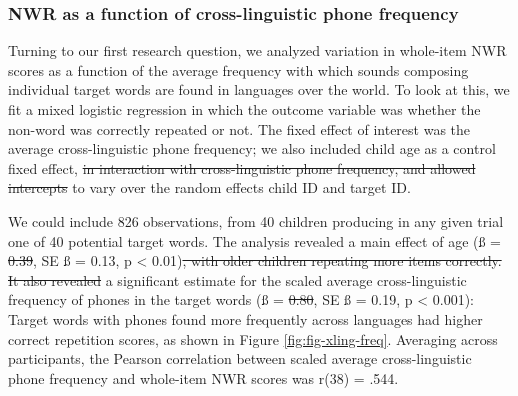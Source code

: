 \documentclass[english,,man,floatsintext]{apa6} %
\providecommand{\DIFaddtex}[1]{{\protect\color{blue}\uwave{#1}}} %
\providecommand{\DIFdeltex}[1]{{\protect\color{red}\sout{#1}}}                      %
\providecommand{\DIFaddbegin}{} %
\providecommand{\DIFaddend}{} %
\providecommand{\DIFdelbegin}{} %
\providecommand{\DIFdelend}{} %
\providecommand{\DIFadd}[1]{\texorpdfstring{\DIFaddtex{#1}}{#1}} %
\providecommand{\DIFdel}[1]{\texorpdfstring{\DIFdeltex{#1}}{}} %
\newcommand{\DIFscaledelfig}{0.5}
\newlength{\DIFdelgraphicswidth} %
\newlength{\DIFdelgraphicsheight} %
\newcommand{\DIFaddincludegraphics}[2][]{{\color{blue}\fbox{\DIFOincludegraphics[#1]{#2}}}} %
\newcommand{\DIFdelincludegraphics}[2][]{%
	\sbox{\DIFdelgraphicsbox}{\DIFOincludegraphics[#1]{#2}}%
	\settoboxwidth{\DIFdelgraphicswidth}{\DIFdelgraphicsbox} %
	\settoboxtotalheight{\DIFdelgraphicsheight}{\DIFdelgraphicsbox} %
	\scalebox{\DIFscaledelfig}{%
		\parbox[b]{\DIFdelgraphicswidth}{\usebox{\DIFdelgraphicsbox}\\[-\baselineskip] \rule{\DIFdelgraphicswidth}{0em}}\llap{\resizebox{\DIFdelgraphicswidth}{\DIFdelgraphicsheight}{%
				\setlength{\unitlength}{\DIFdelgraphicswidth}%
				\begin{picture}(1,1)%
				\thicklines\linethickness{2pt} %
				{\color[rgb]{1,0,0}\put(0,0){\framebox(1,1){}}}%
				{\color[rgb]{1,0,0}\put(0,0){\line( 1,1){1}}}%
				{\color[rgb]{1,0,0}\put(0,1){\line(1,-1){1}}}%
				\end{picture}%
			}\hspace*{3pt}}} %
} %
\DeclareRobustCommand{\DIFaddbegin}{\DIFOaddbegin \let\includegraphics\DIFaddincludegraphics} %
\DeclareRobustCommand{\DIFaddend}{\DIFOaddend \let\includegraphics\DIFOincludegraphics} %
\DeclareRobustCommand{\DIFdelbegin}{\DIFOdelbegin \let\includegraphics\DIFdelincludegraphics} %
\DeclareRobustCommand{\DIFdelend}{\DIFOaddend \let\includegraphics\DIFOincludegraphics} %
\begin{document}
\DIFdelbegin %
\DIFdelend \DIFaddbegin \hypertarget{nwr-as-a-function-of-cross-linguistic-phone-frequency}{%
	\subsubsection{NWR as a function of cross-linguistic phone frequency}\label{nwr-as-a-function-of-cross-linguistic-phone-frequency}}
\DIFaddend 

Turning to our first research question, we analyzed variation in whole-item NWR scores as a function of the average frequency with which sounds composing individual target words are found in languages over the world. To look at this, we fit a mixed logistic regression in which the outcome variable was whether the non-word was correctly repeated or not. The fixed effect of interest was the average cross-linguistic phone frequency; we also included child age as a control fixed effect, \DIFdelbegin \DIFdel{in interaction with cross-linguistic phone frequency, and allowed intercepts }\DIFdelend \DIFaddbegin \DIFadd{and allowed slopes }\DIFaddend to vary over the random effects child ID and target ID.

We could include 826 observations, from 40 children producing in any given trial one of 40 potential target words. The analysis revealed a main effect of age (ß = \DIFdelbegin \DIFdel{0.39}\DIFdelend \DIFaddbegin \DIFadd{0.35}\DIFaddend , SE ß = 0.13, p \textless{} 0.01)\DIFdelbegin \DIFdel{, with older children repeating more items correctly. It also revealed }\DIFdelend \DIFaddbegin \DIFadd{; and }\DIFaddend a significant estimate for the scaled average cross-linguistic frequency of phones in the target words (ß = \DIFdelbegin \DIFdel{0.80}\DIFdelend \DIFaddbegin \DIFadd{0.78}\DIFaddend , SE ß = 0.19, p \textless{} 0.001): Target words with phones found more frequently across languages had higher correct repetition scores, as shown in Figure \ref{fig:fig-xling-freq}. Averaging across participants, the Pearson correlation between scaled average cross-linguistic phone frequency and whole-item NWR scores was r(38) = .544.
\end{document}
